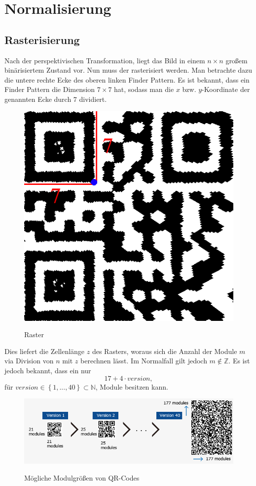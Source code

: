\chapter{Normalisierung}
\section{Rasterisierung}
Nach der perspektivischen Transformation, liegt das Bild in einem $n\times n$ großem binärisiertem Zustand vor. Nun muss der \QRCode rasterisiert werden. 
Man betrachte dazu die untere rechte Ecke des oberen linken Finder Pattern. Es ist bekannt, dass ein Finder Pattern die Dimension $7 \times 7$ hat,
sodass man die $x$ bzw. $y$-Koordinate der genannten Ecke durch $7$ dividiert.
\begin{figure}[h]
\centering
\includegraphics[scale=0.3]{images/Gitter_step.png}
\label{fig:raster-qrcode}\caption{Raster}
\end{figure}

Dies liefert die Zellenlänge $z$ des Rasters,
woraus sich die Anzahl der Module $m$ via Division von $n$ mit $z$ berechnen lässt. Im Normalfall gilt jedoch $m \notin \mathbb{Z}$.
Es ist jedoch bekannt, dass ein \QRCode nur 
\begin {equation}
	17 + 4 \cdot version,
\end{equation}
für $version \in \left\{1, ..., 40\right\} \subset \mathbb{N}$, Module besitzen kann. 
\begin{figure}[h]
\centering
\includegraphics[scale=0.4]{images/QRVersion.png}
\label{fig:version-qrcode}\caption{Mögliche Modulgrößen von QR-Codes}
\end{figure}

